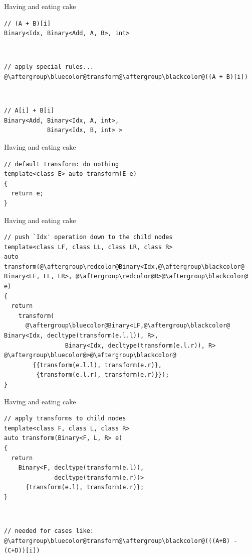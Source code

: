 \documentclass[xcolor=dvipsnames]{beamer}
\begin{document}
\begin{frame}[fragile]{Having and eating cake}
\begin{lstlisting}
// (A + B)[i]
Binary<Idx, Binary<Add, A, B>, int>
\end{lstlisting}

~

\begin{lstlisting}
// apply special rules...
@\aftergroup\bluecolor@transform@\aftergroup\blackcolor@((A + B)[i])
\end{lstlisting}

~

\begin{lstlisting}
// A[i] + B[i]
Binary<Add, Binary<Idx, A, int>,
            Binary<Idx, B, int> >
\end{lstlisting}
\end{frame}


\begin{frame}[fragile]{Having and eating cake}
\begin{lstlisting}
// default transform: do nothing
template<class E> auto transform(E e)
{
  return e;
}
\end{lstlisting}
\end{frame}


\begin{frame}[fragile]{Having and eating cake}
\begin{lstlisting}
// push `Idx' operation down to the child nodes
template<class LF, class LL, class LR, class R>
auto transform(@\aftergroup\redcolor@Binary<Idx,@\aftergroup\blackcolor@ Binary<LF, LL, LR>, @\aftergroup\redcolor@R>@\aftergroup\blackcolor@ e)
{
  return
    transform(
      @\aftergroup\bluecolor@Binary<LF,@\aftergroup\blackcolor@ Binary<Idx, decltype(transform(e.l.l)), R>,
                 Binary<Idx, decltype(transform(e.l.r)), R> @\aftergroup\bluecolor@>@\aftergroup\blackcolor@
        {{transform(e.l.l), transform(e.r)},
         {transform(e.l.r), transform(e.r)}});
}
\end{lstlisting}
\end{frame}


\begin{frame}[fragile]{Having and eating cake}
\begin{lstlisting}
// apply transforms to child nodes
template<class F, class L, class R>
auto transform(Binary<F, L, R> e)
{
  return
    Binary<F, decltype(transform(e.l)),
              decltype(transform(e.r))>
      {transform(e.l), transform(e.r)};
}
\end{lstlisting}

~

\begin{lstlisting}
// needed for cases like:
@\aftergroup\bluecolor@transform@\aftergroup\blackcolor@(((A+B) - (C+D))[i])
\end{lstlisting}
\end{frame}
\end{document}
